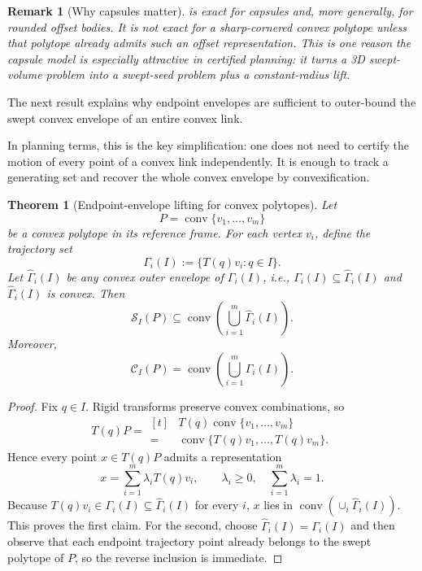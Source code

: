 \documentclass[journal]{IEEEtran}
\newtheorem{theorem}{Theorem}
\newtheorem{remark}{Remark}
\begin{document}
\begin{remark}[Why capsules matter]\label{rem:capsule_exact}
 is exact for capsules and, more generally, for rounded
offset bodies. It is not exact for a sharp-cornered convex polytope unless that
polytope already admits such an offset representation. This is one reason the
capsule model is especially attractive in certified planning: it turns a 3D
swept-volume problem into a swept-seed problem plus a constant-radius lift.
\end{remark}

The next result explains why endpoint envelopes are sufficient to outer-bound
the swept convex envelope of an entire convex link.

In planning terms, this is the key simplification: one does not need to certify
the motion of every point of a convex link independently. It is enough to track
a generating set and recover the whole convex envelope by convexification.

\begin{theorem}[Endpoint-envelope lifting for convex polytopes]
\label{thm:vertex_lift}
Let
\[
P = \operatorname{conv}\{v_1,\dots,v_m\}
\]
be a convex polytope in its reference frame. For each vertex $v_i$, define the
trajectory set
\[
\Gamma_i(I) := \{T(q)v_i : q\in I\}.
\]
Let $\widehat{\Gamma}_i(I)$ be any convex outer envelope of $\Gamma_i(I)$, i.e.,
$\Gamma_i(I) \subseteq \widehat{\Gamma}_i(I)$ and
$\widehat{\Gamma}_i(I)$ is convex. Then
\[
\mathcal{S}_I(P)
\subseteq
\operatorname{conv}\left(\bigcup_{i=1}^m \widehat{\Gamma}_i(I)\right).
\]
Moreover,
\[
\mathcal{C}_I(P)
=
\operatorname{conv}\left(\bigcup_{i=1}^m \Gamma_i(I)\right).
\]
\end{theorem}

\begin{proof}
Fix $q\in I$. Rigid transforms preserve convex combinations, so
\[
T(q)P
= \begin{aligned}[t]
&T(q)\operatorname{conv}\{v_1,\dots,v_m\} \\
=\;&\operatorname{conv}\{T(q)v_1,\dots,T(q)v_m\}.
\end{aligned}
\]
Hence every point $x \in T(q)P$ admits a representation
\[
x = \sum_{i=1}^m \lambda_i T(q)v_i,
\qquad \lambda_i\ge 0,
\quad \sum_{i=1}^m \lambda_i = 1.
\]
Because $T(q)v_i \in \Gamma_i(I) \subseteq \widehat{\Gamma}_i(I)$ for every $i$,
$x$ lies in $\operatorname{conv}(\cup_i \widehat{\Gamma}_i(I))$. This proves the
first claim. For the second, choose
$\widehat{\Gamma}_i(I)=\Gamma_i(I)$ and then observe that each endpoint
trajectory point already belongs to the swept polytope of $P$, so the reverse
inclusion is immediate.
\end{proof}
\end{document}
